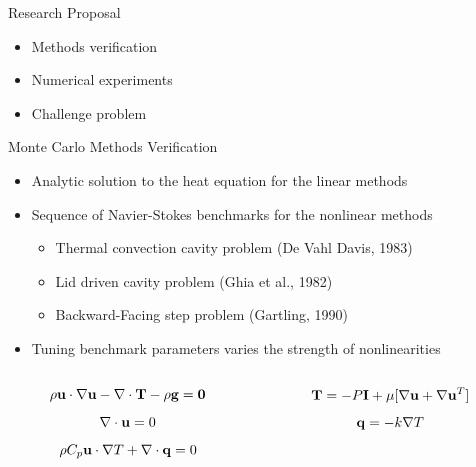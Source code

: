 \documentclass{beamer}
\begin{document}
\begin{frame}{Research Proposal}

  \begin{itemize}
  \item Methods verification
  \item Numerical experiments
  \item Challenge problem
  \end{itemize}

\end{frame}

\begin{frame}{Monte Carlo Methods Verification}

  \begin{itemize}
  \item Analytic solution to the heat equation for the linear methods
  \item Sequence of Navier-Stokes benchmarks for the nonlinear methods
    \begin{itemize}
    \item Thermal convection cavity problem (De Vahl Davis, 1983)
    \item Lid driven cavity problem (Ghia et al., 1982)
    \item Backward-Facing step problem (Gartling, 1990)
    \end{itemize}
  \item Tuning benchmark parameters varies the strength of
    nonlinearities
  \end{itemize}

  \begin{columns}
    \begin{column}{0.5\textwidth}
      \[
      \rho \mathbf{u} \cdot \nabla \mathbf{u} - \nabla \cdot \mathbf{T} - \rho
      \mathbf{g} = \mathbf{0}
      \]
      \[
      \nabla \cdot \mathbf{u} = 0
      \]
      \[
      \rho C_p \mathbf{u} \cdot \nabla T + \nabla \cdot \mathbf{q} = 0
      \]
    \end{column}

    \begin{column}{0.5\textwidth}
      \[
      \mathbf{T} = -P \mathbf{I} + \mu[\nabla \mathbf{u} + \nabla \mathbf{u}^T]
      \]
      \[
      \mathbf{q} = - k \nabla T
      \]
    \end{column}
  \end{columns}

\end{frame}
\end{document}
